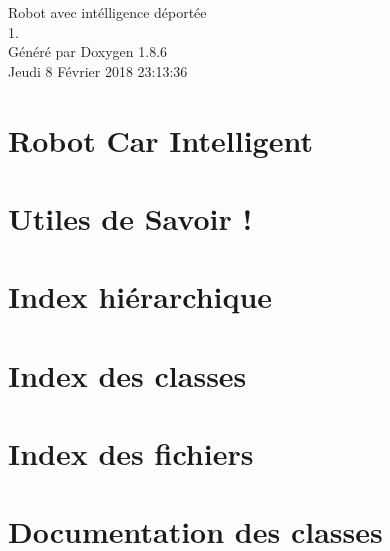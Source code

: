 \documentclass[twoside]{book}
\newcommand{\clearemptydoublepage}{%
  \newpage{\pagestyle{empty}\cleardoublepage}%
}
\begin{document}
\hypersetup{pageanchor=false}
\begin{titlepage}
\vspace*{7cm}
\begin{center}%
{\Large Robot avec intélligence déportée \\[1ex]\large 1. }\\
\vspace*{1cm}
{\large Généré par Doxygen 1.8.6}\\
\vspace*{0.5cm}
{\small Jeudi 8 Février 2018 23:13:36}\\
\end{center}
\end{titlepage}
\clearemptydoublepage
\tableofcontents
\clearemptydoublepage
{}
\hypersetup{pageanchor=true}

\chapter{Robot Car Intelligent}
\label{md__r_e_a_d_m_e}
\hypertarget{md__r_e_a_d_m_e}{}

\chapter{Utiles de Savoir !}
\label{md__utiles}
\hypertarget{md__utiles}{}

\chapter{Index hiérarchique}

\chapter{Index des classes}

\chapter{Index des fichiers}

\chapter{Documentation des classes}














\end{document}

